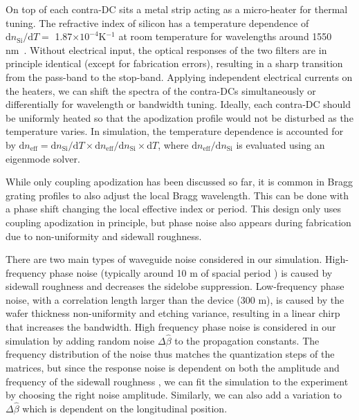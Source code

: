 \documentclass[9pt,twocolumn,twoside]{osajnl}
\begin{document}
	On top of each contra-DC sits a metal strip acting as a micro-heater for thermal tuning.  
	The refractive index of silicon has a temperature dependence of 
	${\mathrm{d}{n_\text{Si}}}/{\mathrm{d}T}=$ 1.87$\times10^{-4}$K$^{-1}$
	at room temperature for wavelengths around 1550 nm~\cite{frey2006temperature}.
	Without electrical input, the optical responses of the two filters are in principle identical (except for fabrication errors), resulting in a sharp transition from the pass-band to the stop-band. 
	Applying independent electrical currents on the heaters, we can shift the spectra of the contra-DCs simultaneously or differentially for wavelength or bandwidth tuning.
	Ideally, each contra-DC should be uniformly heated so that the apodization profile would not be disturbed as the temperature varies.
	In simulation, the temperature dependence is accounted for by 
	$\mathrm{d}n_\text{eff}=\mathrm{d}n_\text{Si}/{\mathrm{d}T}\times\mathrm{d}n_\text{eff}/{\mathrm{d}n_\text{Si}}\times\mathrm{d}T$, where $\mathrm{d}n_\text{eff}/{\mathrm{d}n_\text{Si}}$ is evaluated using an eigenmode solver.
	
	While only coupling apodization has been discussed so far, it is common in Bragg grating profiles to also adjust the local Bragg wavelength. This can be done with a phase shift changing the local effective index or period. This design only uses coupling apodization in principle, but phase noise also appears during fabrication due to non-uniformity and sidewall roughness.
	
	There are two main types of waveguide noise considered in our simulation. High-frequency phase noise (typically around 10 \textmu m of spacial period \cite{simard2013characterization}) is caused by sidewall roughness and decreases the sidelobe suppression. Low-frequency phase noise, with a correlation length larger than the device (300 \textmu m), is caused by the wafer thickness non-uniformity and etching variance, resulting in a linear chirp that increases the bandwidth.
	High frequency phase noise is considered in our simulation by adding random noise $\Delta\hat{\beta}$ to the propagation constants. The frequency distribution of the noise thus matches the quantization steps of the matrices, but since the response noise is dependent on both the amplitude and frequency of the sidewall roughness \cite{simard2011impact}, we can fit the simulation to the experiment by choosing the right noise amplitude.
	Similarly, we can also add a variation to $\Delta\hat{\beta}$ which is dependent on the longitudinal position.
	
\end{document}
